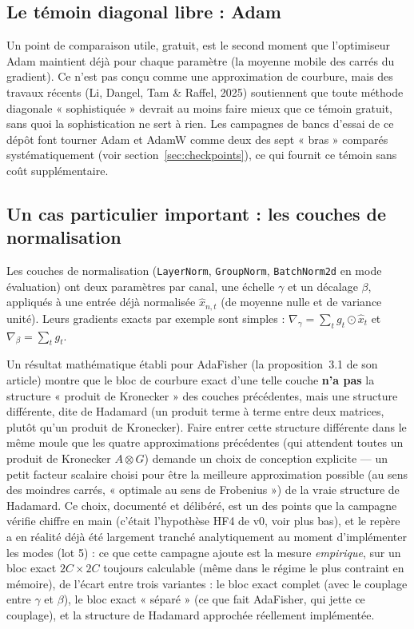 \documentclass[11pt,a4paper]{article}
\begin{document}
\subsection{Le témoin diagonal libre : Adam}

Un point de comparaison utile, gratuit, est le second moment que l'optimiseur Adam maintient déjà
pour chaque paramètre (la moyenne mobile des carrés du gradient). Ce n'est pas conçu comme une
approximation de courbure, mais des travaux récents (Li, Dangel, Tam \& Raffel, 2025) soutiennent
que toute méthode diagonale « sophistiquée » devrait au moins faire mieux que ce témoin gratuit, sans
quoi la sophistication ne sert à rien. Les campagnes de bancs d'essai de ce dépôt font tourner Adam
et AdamW comme deux des sept « bras » comparés systématiquement (voir section~\ref{sec:checkpoints}),
ce qui fournit ce témoin sans coût supplémentaire.

\subsection{Un cas particulier important : les couches de normalisation}

Les couches de normalisation (\texttt{LayerNorm}, \texttt{GroupNorm}, \texttt{BatchNorm2d} en mode
évaluation) ont deux paramètres par canal, une échelle $\gamma$ et un décalage $\beta$, appliqués à
une entrée déjà normalisée $\hat x_{n,t}$ (de moyenne nulle et de variance unité). Leurs gradients
exacts par exemple sont simples : $\nabla_\gamma=\sum_t g_t\odot\hat x_t$ et
$\nabla_\beta=\sum_t g_t$.

Un résultat mathématique établi pour AdaFisher (la proposition~3.1 de son article) montre que le
bloc de courbure exact d'une telle couche \textbf{n'a pas} la structure « produit de Kronecker »
des couches précédentes, mais une structure différente, dite de Hadamard (un produit terme à
terme entre deux matrices, plutôt qu'un produit de Kronecker). Faire entrer cette structure
différente dans le même moule que les quatre approximations précédentes (qui attendent toutes un
produit de Kronecker $A\otimes G$) demande un choix de conception explicite — un petit facteur
scalaire choisi pour être la meilleure approximation possible (au sens des moindres carrés,
« optimale au sens de Frobenius ») de la vraie structure de Hadamard. Ce choix, documenté et
délibéré, est un des points que la campagne vérifie chiffre en main (c'était l'hypothèse HF4 de v0,
voir plus bas), et le repère a en réalité déjà été largement tranché analytiquement au moment
d'implémenter les modes (lot 5) : ce que cette campagne ajoute est la mesure \emph{empirique}, sur
un bloc exact $2C\times 2C$ toujours calculable (même dans le régime le plus contraint en mémoire),
de l'écart entre trois variantes : le bloc exact complet (avec le couplage entre $\gamma$ et
$\beta$), le bloc exact « séparé » (ce que fait AdaFisher, qui jette ce couplage), et la structure de
Hadamard approchée réellement implémentée.
\end{document}
